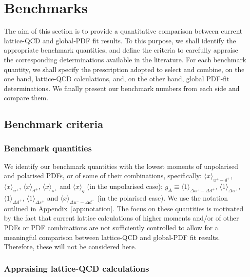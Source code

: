 \section{Benchmarks}
\label{sec:benchmarking}

The aim of this section is to provide a quantitative comparison between 
current lattice-QCD and global-PDF fit results.
%
To this purpose, we shall identify the appropriate benchmark quantities, 
and define the criteria to carefully appraise the corresponding determinations
available in the literature.
%
For each benchmark quantity, we shall specify the prescription adopted to 
select and combine, on the one hand, lattice-QCD calculations, and, on the 
other hand, global PDF-fit determinations.
%
We finally present our benchmark numbers from each side and compare them.

\subsection{Benchmark criteria}
\label{subsec:BC}

\subsubsection{Benchmark quantities}
\label{subsubsec:BQ}

We identify our benchmark quantities with the lowest moments of unpolarised 
and polarised PDFs, or of some of their combinations, specifically: 
$\langle x\rangle_{u^+-d^+}$, $\langle x \rangle_{u^+}$, $\langle x \rangle_{d^+}$, 
$\langle x \rangle_{s^+}$ and $\langle x \rangle_{g}$ (in the unpolarised case); 
$g_A\equiv\langle 1 \rangle_{\Delta u^+ - \Delta d ^+}$, 
$\langle 1 \rangle_{\Delta u^+}$, $\langle 1 \rangle_{\Delta d^+}$,  
$\langle 1 \rangle_{\Delta s^+}$ and $\langle x \rangle_{\Delta u^- - \Delta d^-}$ 
(in the polarised case).
%
We use the notation outlined in Appendix~\ref{app:notation}.
%
The focus on these quantities is motivated by the fact that
current lattice calculations of higher moments and/or of other PDFs or PDF 
combinations are not sufficiently controlled to allow for a meaningful 
comparison between lattice-QCD and global-PDF fit results.
%
Therefore, these will not be considered here. 

\subsubsection{Appraising lattice-QCD calculations}
\label{subsubsec:BClQCD}


